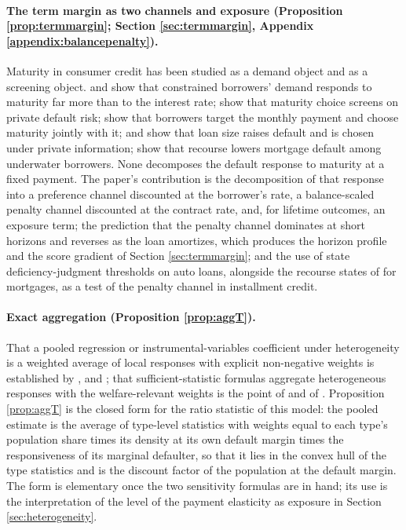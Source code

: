 \paragraph{The term margin as two channels and exposure (Proposition \ref{prop:termmargin}; Section \ref{sec:termmargin}, Appendix \ref{appendix:balancepenalty}).} Maturity in consumer credit has been studied as a demand object and as a screening object. \citet{attanasio_credit_2008} and \citet{karlan_credit_2008} show that constrained borrowers' demand responds to maturity far more than to the interest rate; \citet{hertzberg_screening_2018} show that maturity choice screens on private default risk; \citet{argyle_monthly_2020} show that borrowers target the monthly payment and choose maturity jointly with it; \citet{adams_liquidity_2009} and \citet{einav_contract_2012} show that loan size raises default and is chosen under private information; \citet{ghent_recourse_2011} show that recourse lowers mortgage default among underwater borrowers. None decomposes the default response to maturity at a fixed payment. The paper's contribution is the decomposition of that response into a preference channel discounted at the borrower's rate, a balance-scaled penalty channel discounted at the contract rate, and, for lifetime outcomes, an exposure term; the prediction that the penalty channel dominates at short horizons and reverses as the loan amortizes, which produces the horizon profile and the score gradient of Section \ref{sec:termmargin}; and the use of state deficiency-judgment thresholds on auto loans, alongside the recourse states of \citet{ghent_recourse_2011} for mortgages, as a test of the penalty channel in installment credit.

\paragraph{Exact aggregation (Proposition \ref{prop:aggT}).} That a pooled regression or instrumental-variables coefficient under heterogeneity is a weighted average of local responses with explicit non-negative weights is established by \citet{yitzhaki_using_1996}, \citet{angrist_two-stage_1995} and \citet{heckman_structural_2005}; that sufficient-statistic formulas aggregate heterogeneous responses with the welfare-relevant weights is the point of \citet{chetty_sufficient_2009} and of \citet{kleven_sufficient_2021}. Proposition \ref{prop:aggT} is the closed form for the ratio statistic of this model: the pooled estimate is the average of type-level statistics with weights equal to each type's population share times its density at its own default margin times the responsiveness of its marginal defaulter, so that it lies in the convex hull of the type statistics and is the discount factor of the population at the default margin. The form is elementary once the two sensitivity formulas are in hand; its use is the interpretation of the level of the payment elasticity as exposure in Section \ref{sec:heterogeneity}.

